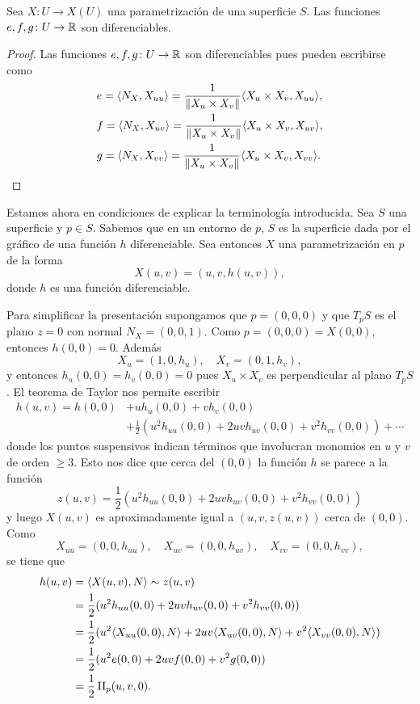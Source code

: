 \begin{proposition}
	Sea $X\colon U\to X(U)$ una parametrización de una superficie $S$. Las
	funciones $e,f,g\colon U\to\mathbb{R}$ son diferenciables. 
\end{proposition}

\begin{proof}
	Las funciones $e,f,g\colon U\to\mathbb{R}$ son diferenciables pues pueden
	escribirse como
	\begin{align*}
		&e=\langle N_X, X_{uu}\rangle=\frac{1}{\|X_u\times X_v\|}\langle X_u\times X_v,X_{uu}\rangle,\\
		&f=\langle N_X, X_{uv}\rangle=\frac{1}{\|X_u\times X_v\|}\langle X_u\times X_v,X_{uv}\rangle,\\
		&g=\langle N_X, X_{vv}\rangle=\frac{1}{\|X_u\times X_v\|}\langle X_u\times X_v,X_{vv}\rangle.\qedhere
	\end{align*}
\end{proof}

Estamos ahora en condiciones de explicar la terminología introducida. Sea $S$
una superficie y $p\in S$. Sabemos que en un entorno de $p$, $S$ es la
superficie dada por el gráfico de una función $h$ diferenciable. Sea entonces $X$
una parametrización en $p$ de la forma
\[
	X(u,v)=(u,v,h(u,v)),
\]
donde $h$ es una función diferenciable. 

Para simplificar la presentación supongamos que $p=(0,0,0)$ y que $T_pS$ es el
plano $z=0$ con normal $N_X=(0,0,1)$. Como $p=(0,0,0)=X(0,0)$, entonces
$h(0,0)=0$. Además 
\[
	X_u=(1,0,h_u),\quad
	X_v=(0,1,h_v),
\]
y entonces 
$h_u(0,0)=h_v(0,0)=0$ pues $X_u\times X_v$ es perpendicular al
plano $T_pS$.  El teorema de Taylor nos permite escribir
\begin{align*}
	h(u,v)=h(0,0)&+uh_u(0,0)+vh_v(0,0)\\
	&+\frac12(u^2h_{uu}(0,0)+2uvh_{uv}(0,0)+v^2h_{vv}(0,0))+\cdots
\end{align*}
donde los puntos suspensivos indican términos que involucran monomios en $u$ y
$v$ de orden $\geq3$. Esto nos dice que cerca del $(0,0)$ la función $h$ se
parece a la función 
\[
	z(u,v)=\frac12(u^2h_{uu}(0,0)+2uvh_{uv}(0,0)+v^2h_{vv}(0,0))
\]
y luego $X(u,v)$ es aproximadamente igual a $(u,v,z(u,v))$ cerca de $(0,0)$. 
Como
\[
	X_{uu}=(0,0,h_{uu}),\quad
	X_{uv}=(0,0,h_{uv}),\quad
	X_{vv}=(0,0,h_{vv}),
\]
se tiene que 
\begin{align*}
	h(u,v)
	&=\langle X(u,v),N\rangle
	\sim z(u,v)\\
	&=\frac12(u^2h_{uu}(0,0)+2uvh_{uv}(0,0)+v^2h_{vv}(0,0))\\
	&=\frac12(u^2\langle X_{uu}(0,0),N\rangle +2uv\langle X_{uv}(0,0),N\rangle +v^2\langle X_{vv}(0,0),N\rangle)\\
	&=\frac12(u^2e(0,0)+2uvf(0,0)+v^2g(0,0))\\
	&=\frac12\operatorname{II}_p(u,v,0).
\end{align*}


